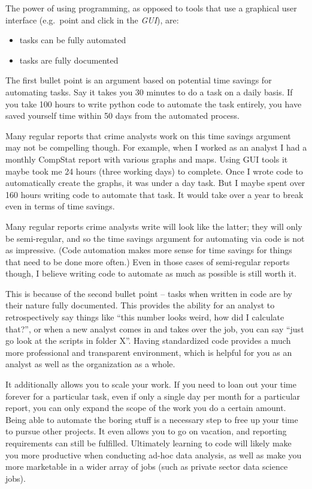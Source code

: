 \documentclass[
  letterpaper,
]{scrbook}
\providecommand{\tightlist}{%
  \setlength{\itemsep}{0pt}\setlength{\parskip}{0pt}}\usepackage{longtable,booktabs,array}
\begin{document}
The power of using programming, as opposed to tools that use a graphical
user interface (e.g.~point and click in the \emph{GUI}), are:

\begin{itemize}
\tightlist
\item
  tasks can be fully automated
\item
  tasks are fully documented
\end{itemize}

The first bullet point is an argument based on potential time savings
for automating tasks. Say it takes you 30 minutes to do a task on a
daily basis. If you take 100 hours to write python code to automate the
task entirely, you have saved yourself time within 50 days from the
automated process.

Many regular reports that crime analysts work on this time savings
argument may not be compelling though. For example, when I worked as an
analyst I had a monthly CompStat report with various graphs and maps.
Using GUI tools it maybe took me 24 hours (three working days) to
complete. Once I wrote code to automatically create the graphs, it was
under a day task. But I maybe spent over 160 hours writing code to
automate that task. It would take over a year to break even in terms of
time savings.

Many regular reports crime analysts write will look like the latter;
they will only be semi-regular, and so the time savings argument for
automating via code is not as impressive. (Code automation makes more
sense for time savings for things that need to be done more often.) Even
in those cases of semi-regular reports though, I believe writing code to
automate as much as possible is still worth it.

This is because of the second bullet point -- tasks when written in code
are by their nature fully documented. This provides the ability for an
analyst to retrospectively say things like ``this number looks weird,
how did I calculate that?'', or when a new analyst comes in and takes
over the job, you can say ``just go look at the scripts in folder X''.
Having standardized code provides a much more professional and
transparent environment, which is helpful for you as an analyst as well
as the organization as a whole.

It additionally allows you to scale your work. If you need to loan out
your time forever for a particular task, even if only a single day per
month for a particular report, you can only expand the scope of the work
you do a certain amount. Being able to automate the boring stuff is a
necessary step to free up your time to pursue other projects. It even
allows you to go on vacation, and reporting requirements can still be
fulfilled. Ultimately learning to code will likely make you more
productive when conducting ad-hoc data analysis, as well as make you
more marketable in a wider array of jobs (such as private sector data
science jobs).
\end{document}
